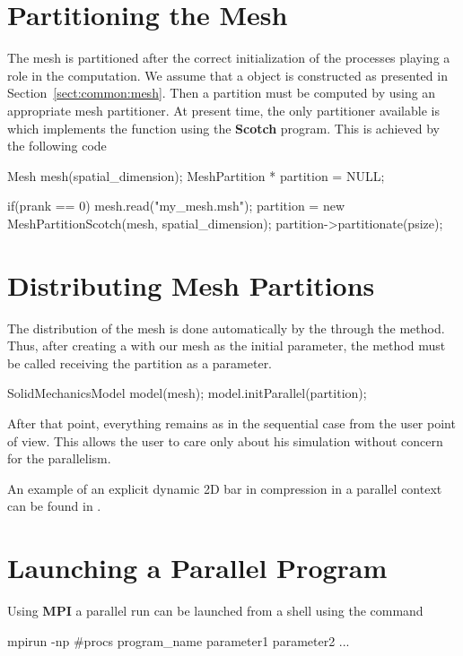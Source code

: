 \section{Partitioning the Mesh}

The mesh is partitioned after the correct initialization of the
processes playing a role in the computation. We assume that a
 object is constructed as presented in
Section~\ref{sect:common:mesh}.  Then a partition must be computed by
using an appropriate mesh partitioner. At present time, the only
partitioner available is  which implements
the function  using the
\textbf{Scotch}\cite{scotch} program.  This is achieved by the
following code

\begin{cpp}
  Mesh mesh(spatial_dimension);
  MeshPartition * partition = NULL;

  if(prank == 0) {
    mesh.read("my_mesh.msh");
    partition = new MeshPartitionScotch(mesh, spatial_dimension);
    partition->partitionate(psize);
  }
\end{cpp}


\section{Distributing Mesh Partitions}

The distribution of the mesh is done automatically by the
 through the  method.  Thus,
after creating a  with our mesh as the initial
parameter, the  method must be called receiving the partition
as a parameter.

\begin{cpp}
  SolidMechanicsModel model(mesh);
  model.initParallel(partition);
\end{cpp}

After that point, everything remains as in the sequential case from
the user point of view. This allows the user to care only
about his simulation without concern for the parallelism.

An example of an explicit dynamic 2D bar in compression in a parallel
context can be found in .

\section{Launching a Parallel Program}

Using \textbf{MPI} a parallel run can be launched from a shell
using the command

\begin{cpp}
  mpirun -np #procs program_name parameter1 parameter2 ...
\end{cpp}

